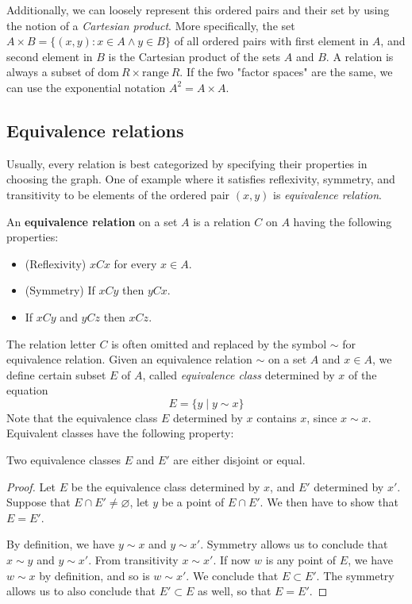 Additionally, we can loosely represent this ordered pairs and their set by using the notion of a \textit{Cartesian product}. More specifically, the set $A\times B  = \{(x,y): x\in A \land y \in B\}$ of all ordered pairs with first element in $A$, and second element in $B$ is the Cartesian product of the sets $A$ and $B$. A relation is always a subset of $\mathrm{dom}\: R \times \mathrm{range}\: R$. If the fwo "factor spaces" are the same, we can use the exponential notation $A^{2}=A\times A$. 
\subsection{Equivalence relations}
Usually, every relation is best categorized by specifying their properties in choosing the graph. One of example where it satisfies reflexivity, symmetry, and transitivity to be elements of the ordered pair $(x,y)$ is \textit{equivalence relation}. 
\begin{definition}
    An \textbf{equivalence relation} on a set $A$ is a relation $C$ on $A$ having the following properties: 
    \begin{itemize}[topsep=0pt,noitemsep]
        \item (Reflexivity) $xCx$ for every $x\in A$. 
        \item (Symmetry) If $xCy$ then $yCx$. 
        \item If $xCy$ and $yCz$ then $xCz$. 
    \end{itemize}
\end{definition}
The relation letter $C$ is often omitted and replaced by the symbol $\sim$ for equivalence relation. Given an equivalence relation $\sim$ on a set $A$ and $x\in A$, we define certain subset $E$ of $A$, called \textit{equivalence class} determined by $x$ of the equation \begin{equation*}
    E=\{y\mid y \sim x\}
\end{equation*}
Note that the equivalence class $E$ determined by $x$ contains $x$, since $x\sim x$. Equivalent classes have the following property: 
\begin{lemma}
    Two equivalence classes $E$ and $E'$ are either disjoint or equal. 
\end{lemma}
\begin{proof}
    Let $E$ be the equivalence class determined by $x$, and $E'$ determined by $x'$. Suppose that $E\cap E'\neq \varnothing$, let $y$ be a point of $E\cap E'$. We then have to show that $E=E'$. 

    By definition, we have $y\sim x$ and $y\sim x'$. Symmetry allows us to conclude that $x\sim y$ and $y\sim x'$. From transitivity $x\sim x'$. If now $w$ is any point of $E$, we have $w\sim x$ by definition, and so is $w\sim x'$. We conclude that $E\subset E'$. The symmetry allows us to also conclude that $E'\subset E$ as well, so that $E=E'$. 
\end{proof}


